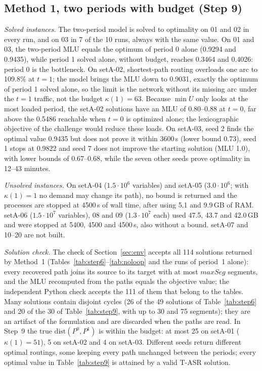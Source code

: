 \documentclass[conference]{IEEEtran}
\begin{document}
\subsection{Method 1, two periods with budget (Step 9)}
\emph{Solved instances.} The two-period model is solved to optimality on 01 and 02 in every run, and on 03 in 7 of the 10 runs, always with the same value. On 01 and 03, the two-period MLU equals the optimum of period 0 alone (0.9294 and 0.9435), while period 1 solved alone, without budget, reaches 0.3464 and 0.4026: period 0 is the bottleneck. On setA-02, shortest-path routing overloads one arc to 109.8\% at $t=1$; the model brings the MLU down to 0.9031, exactly the optimum of period 1 solved alone, so the limit is the network without its missing arc under the $t=1$ traffic, not the budget $\kappa(1)=63$. Because $\min U$ only looks at the most loaded period, the setA-02 solutions have an MLU of 0.80--0.88 at $t=0$, far above the 0.5486 reachable when $t=0$ is optimized alone; the lexicographic objective of the challenge would reduce these loads. On setA-03, seed 2 finds the optimal value 0.9435 but does not prove it within 3600\,s (lower bound 0.73), seed 1 stops at 0.9822 and seed 7 does not improve the starting solution (MLU 1.0), with lower bounds of 0.67--0.68, while the seven other seeds prove optimality in 12--43 minutes.

\emph{Unsolved instances.} On setA-04 ($1.5\cdot10^6$ variables) and setA-05 ($3.0\cdot10^6$; with $\kappa(1)=1$ no demand may change its path), no bound is returned and the processes are stopped at 4500\,s of wall time, after using 5.1 and 9.9\,GB of RAM. setA-06 ($1.5\cdot10^7$ variables), 08 and 09 ($1.3\cdot10^7$ each) used 47.5, 43.7 and 42.0\,GB and were stopped at 5400, 4500 and 4500\,s, also without a bound. setA-07 and 10--20 are not built.

\emph{Solution check.} The check of Section~\ref{sec:env} accepts all 114 solutions returned by Method~1 (Tables~\ref{tab:step6}--\ref{tab:noloop} and the runs of period~1 alone): every recovered path joins its source to its target with at most $maxSeg$ segments, and the MLU recomputed from the paths equals the objective value; the independent Python check accepts the 111 of them that belong to the tables. Many solutions contain disjoint cycles (26 of the 49 solutions of Table~\ref{tab:step6} and 20 of the 30 of Table~\ref{tab:step9}, with up to 30 and 75 segments); they are an artifact of the formulation and are discarded when the paths are read. In Step~9 the true $\mathrm{dist}(P^0,P^1)$ is within the budget: at most 25 on setA-01 ($\kappa(1)=51$), 5 on setA-02 and 4 on setA-03. Different seeds return different optimal routings, some keeping every path unchanged between the periods; every optimal value in Table~\ref{tab:step9} is attained by a valid T-ASR solution.
\end{document}
